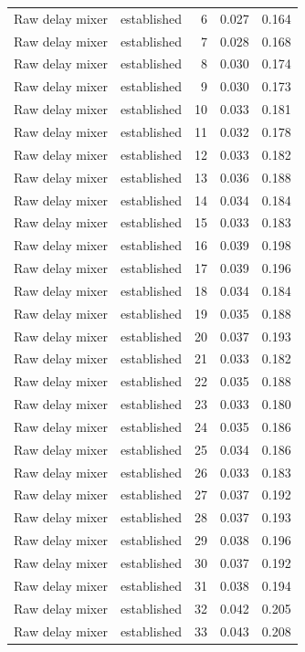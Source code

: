 \begin{tabular}{llrrr}
Raw delay mixer & established & 6 & 0.027 & 0.164 \\
Raw delay mixer & established & 7 & 0.028 & 0.168 \\
Raw delay mixer & established & 8 & 0.030 & 0.174 \\
Raw delay mixer & established & 9 & 0.030 & 0.173 \\
Raw delay mixer & established & 10 & 0.033 & 0.181 \\
Raw delay mixer & established & 11 & 0.032 & 0.178 \\
Raw delay mixer & established & 12 & 0.033 & 0.182 \\
Raw delay mixer & established & 13 & 0.036 & 0.188 \\
Raw delay mixer & established & 14 & 0.034 & 0.184 \\
Raw delay mixer & established & 15 & 0.033 & 0.183 \\
Raw delay mixer & established & 16 & 0.039 & 0.198 \\
Raw delay mixer & established & 17 & 0.039 & 0.196 \\
Raw delay mixer & established & 18 & 0.034 & 0.184 \\
Raw delay mixer & established & 19 & 0.035 & 0.188 \\
Raw delay mixer & established & 20 & 0.037 & 0.193 \\
Raw delay mixer & established & 21 & 0.033 & 0.182 \\
Raw delay mixer & established & 22 & 0.035 & 0.188 \\
Raw delay mixer & established & 23 & 0.033 & 0.180 \\
Raw delay mixer & established & 24 & 0.035 & 0.186 \\
Raw delay mixer & established & 25 & 0.034 & 0.186 \\
Raw delay mixer & established & 26 & 0.033 & 0.183 \\
Raw delay mixer & established & 27 & 0.037 & 0.192 \\
Raw delay mixer & established & 28 & 0.037 & 0.193 \\
Raw delay mixer & established & 29 & 0.038 & 0.196 \\
Raw delay mixer & established & 30 & 0.037 & 0.192 \\
Raw delay mixer & established & 31 & 0.038 & 0.194 \\
Raw delay mixer & established & 32 & 0.042 & 0.205 \\
Raw delay mixer & established & 33 & 0.043 & 0.208 \\

\end{tabular}
